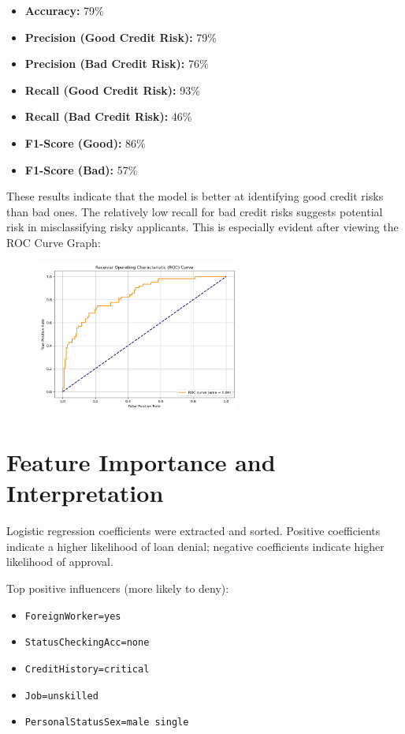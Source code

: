 \documentclass[12pt]{article}
\begin{document}
	\begin{itemize}
		\item \textbf{Accuracy:} 79\%
		\item \textbf{Precision (Good Credit Risk):} 79\%
		\item \textbf{Precision (Bad Credit Risk):} 76\%
		\item \textbf{Recall (Good Credit Risk):} 93\%
		\item \textbf{Recall (Bad Credit Risk):} 46\%
		\item \textbf{F1-Score (Good):} 86\%
		\item \textbf{F1-Score (Bad):} 57\%
	\end{itemize}
	
	These results indicate that the model is better at identifying good credit risks than bad ones. The relatively low recall for bad credit risks suggests potential risk in misclassifying risky applicants. This is especially evident after viewing the ROC Curve Graph:
	
	\begin{figure}[h]
		\centering
		\includegraphics[width=0.6\textwidth]{ROCCurve.png}
	\end{figure}
	
	\section{Feature Importance and Interpretation}
	Logistic regression coefficients were extracted and sorted. Positive coefficients indicate a higher likelihood of loan denial; negative coefficients indicate higher likelihood of approval.
	
	Top positive influencers (more likely to deny):
	\begin{itemize}
		\item \texttt{ForeignWorker=yes}
		\item \texttt{StatusCheckingAcc=none}
		\item \texttt{CreditHistory=critical}
		\item \texttt{Job=unskilled}
		\item \texttt{PersonalStatusSex=male single}
	\end{itemize}
	
\end{document}
